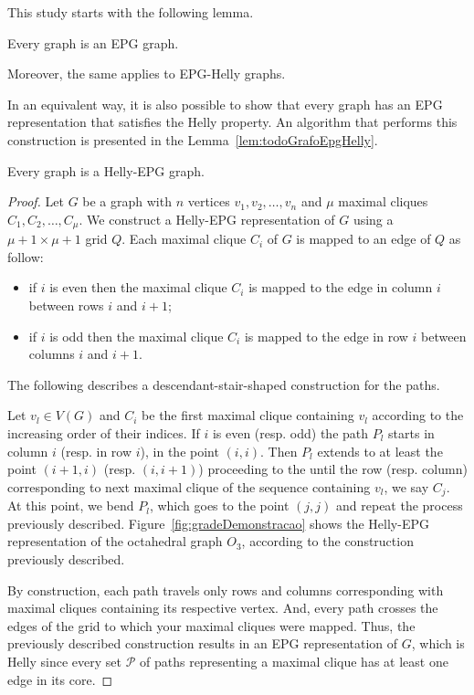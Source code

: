 This study starts with the following lemma.

\begin{lemma} \label{lem:todoGrafoEpg}
 Every graph is an EPG graph.
 \end{lemma}
 
 Moreover, the same applies to EPG-Helly graphs. 
 
In an equivalent way, it is also possible to show that every graph has an EPG representation that satisfies the Helly property. An algorithm that performs this construction is presented in the Lemma~\ref{lem:todoGrafoEpgHelly}.

 \begin{lemma}\label{lem:todoGrafoEpgHelly}
 Every graph is a Helly-EPG graph.
 \end{lemma}

\begin{proof}
Let $G$ be a graph with $n$ vertices $v_1, v_2, \dots, v_n$ and $\mu$ maximal cliques $C_1, C_2, \dots , C_{\mu }$. We construct a Helly-EPG representation of $G$ using a $\mu +1\times \mu +1$ grid $Q$. 
Each maximal clique $C_i$ of $G$ is mapped to an edge of $Q$ as follow: 
\begin{itemize}
    \item if $i$ is even then the maximal clique $C_i$ is mapped to the edge in column $i$ between rows $i$ and $i+1$;
    \item if $i$ is odd then the maximal clique $C_i$ is mapped to the edge in row $i$ between columns $i$ and $i+1$.
\end{itemize}

The following describes a descendant-stair-shaped construction for the paths.
  
Let $v_l \in V(G)$ and $C_i$ be the first maximal clique containing $v_l$ according to the increasing order of their indices. If $i$ is even (resp. odd) the path $P_l$ starts in column $i$ (resp. in row $i$), in the point $(i,i)$. Then $P_l$ extends to at least the point $(i+1, i)$ (resp. $(i, i+1)$) proceeding to the until the row (resp. column) corresponding to next maximal clique of the sequence containing $v_l$, we say $C_{j}$.
At this point, we bend $P_l$, which goes to the point $(j,j)$ and repeat the process previously described. 
%
Figure~\ref{fig:gradeDemonstracao} shows the Helly-EPG representation of the octahedral graph $O_3$, according to the construction previously described.

By construction, each path travels only rows and columns corresponding with maximal cliques containing its respective vertex. And, every path crosses the edges of the grid to which your maximal cliques were mapped. Thus, the previously described construction results in an EPG representation of $G$, which is Helly since every set ${\mathcal P}$ of paths representing a maximal clique has at least one edge in its core.
\end{proof}
 
